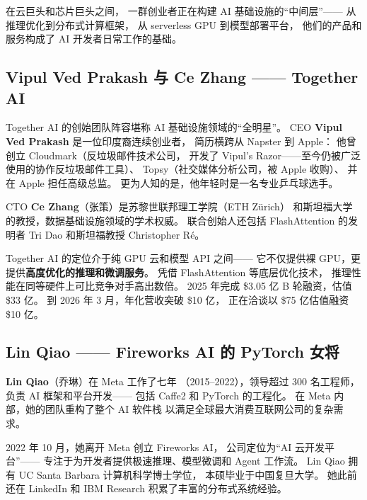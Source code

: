 在云巨头和芯片巨头之间，
一群创业者正在构建 AI 基础设施的``中间层''——
从推理优化到分布式计算框架，
从 serverless GPU 到模型部署平台，
他们的产品和服务构成了 AI 开发者日常工作的基础。

\subsection{Vipul Ved Prakash 与 Ce Zhang —— Together AI}
\label{subsec:together-ai}

Together AI 的创始团队阵容堪称 AI 基础设施领域的``全明星''。
CEO \textbf{Vipul Ved Prakash} 是一位印度裔连续创业者，
简历横跨从 Napster 到 Apple：
他曾创立 Cloudmark（反垃圾邮件技术公司，
开发了 Vipul's Razor——至今仍被广泛使用的协作反垃圾邮件工具）、
Topsy（社交媒体分析公司，被 Apple 收购）、
并在 Apple 担任高级总监。
更为人知的是，他年轻时是一名专业乒乓球选手。

CTO \textbf{Ce Zhang}（张策）是苏黎世联邦理工学院（ETH Z\"{u}rich）
和斯坦福大学的教授，数据基础设施领域的学术权威。
联合创始人还包括 FlashAttention 的发明者 Tri Dao
和斯坦福教授 Christopher R\'{e}。

Together AI 的定位介于纯 GPU 云和模型 API 之间——
它不仅提供裸 GPU，更提供\textbf{高度优化的推理和微调服务}。
凭借 FlashAttention 等底层优化技术，
推理性能在同等硬件上可比竞争对手高出数倍。
2025 年完成 \$3.05 亿 B 轮融资，估值 \$33 亿。
到 2026 年 3 月，年化营收突破 \$10 亿，
正在洽谈以 \$75 亿估值融资 \$10 亿。

\subsection{Lin Qiao —— Fireworks AI 的 PyTorch 女将}
\label{subsec:fireworks}

\textbf{Lin Qiao}（乔琳）在 Meta 工作了七年
（2015--2022），领导超过 300 名工程师，
负责 AI 框架和平台开发——
包括 Caffe2 和 PyTorch 的工程化。
在 Meta 内部，她的团队重构了整个 AI 软件栈
以满足全球最大消费互联网公司的复杂需求。

2022 年 10 月，她离开 Meta 创立 Fireworks AI，
公司定位为``AI 云开发平台''——
专注于为开发者提供极速推理、模型微调和 Agent 工作流。
Lin Qiao 拥有 UC Santa Barbara 计算机科学博士学位，
本硕毕业于中国复旦大学。
她此前还在 LinkedIn 和 IBM Research 积累了丰富的分布式系统经验。

